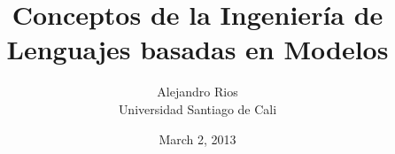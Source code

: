 \documentclass{article}
\begin{document}

\title{Conceptos de la Ingeniería de Lenguajes basadas en Modelos}
\author{
	Alejandro Rios \\
	Universidad Santiago de Cali\\
  }

\date{March 2, 2013}

\maketitle












 


\end{document}
